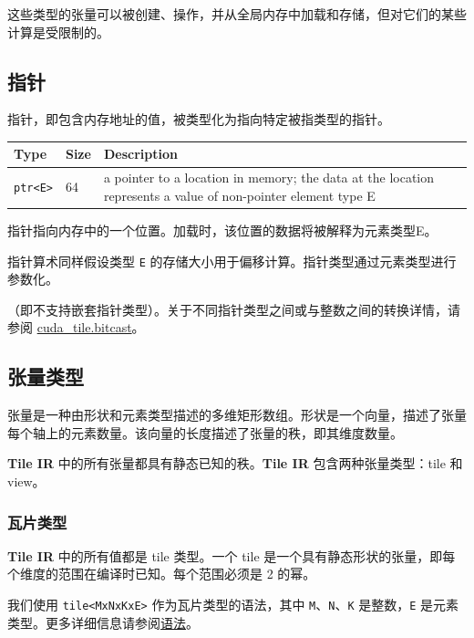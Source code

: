 \documentclass{article}
\begin{document}
这些类型的张量可以被创建、操作，并从全局内存中加载和存储，但对它们的某些计算是受限制的。



\subsection{指针}

指针，即包含内存地址的值，被类型化为指向特定被指类型的指针。


\begin{longtable}{l|l|l}
\hline
Type & Size & Description \\ \hline
\texttt{ptr<E>} & 64 & a pointer to a location in memory; the data at the location represents a value of non-pointer element type E \\ \hline
\end{longtable}

指针指向内存中的一个位置。加载时，该位置的数据将被解释为元素类型E。


指针算术同样假设类型 \texttt{E} 的存储大小用于偏移计算。指针类型通过元素类型进行参数化。

（即不支持嵌套指针类型）。关于不同指针类型之间或与整数之间的转换详情，请参阅 \href{https://docs.nvidia.com/cuda/tile-ir/latest/sections/operations.html#op-cuda-tile-bitcast}{cuda\_tile.bitcast}。



\subsection{张量类型}

张量是一种由形状和元素类型描述的多维矩形数组。形状是一个向量，描述了张量每个轴上的元素数量。该向量的长度描述了张量的秩，即其维度数量。

\textbf{Tile IR} 中的所有张量都具有静态已知的秩。\textbf{Tile IR} 包含两种张量类型：tile 和 view。


\subsubsection{瓦片类型}

\textbf{Tile IR} 中的所有值都是 tile 类型。一个 tile 是一个具有静态形状的张量，即每个维度的范围在编译时已知。每个范围必须是 2 的幂。


我们使用 \texttt{tile<MxNxKxE>} 作为瓦片类型的语法，其中 \texttt{M}、\texttt{N}、\texttt{K} 是整数，\texttt{E} 是元素类型。更多详细信息请参阅\href{https://docs.nvidia.com/cuda/tile-ir/latest/sections/syntax.html#section-syntax}{语法}。
\end{document}
